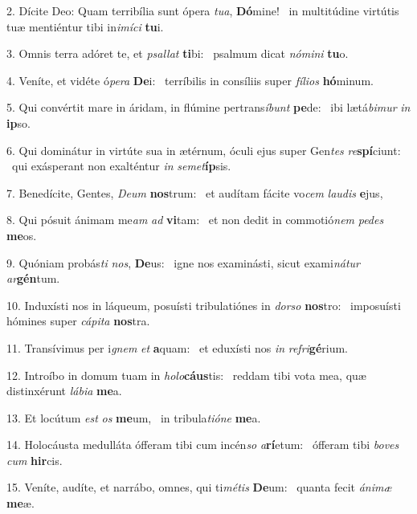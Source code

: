 2. Dícite Deo: Quam terribília sunt ópera \textit{tu}\textit{a}, \textbf{Dó}mine! \ast\  in multitúdine virtútis tuæ mentiéntur tibi in\textit{i}\textit{mí}\textit{ci} \textbf{tu}i.\

3. Omnis terra adóret te, et \textit{psal}\textit{lat} \textbf{ti}bi: \ast\  psalmum dicat \textit{nó}\textit{mi}\textit{ni} \textbf{tu}o.\

4. Veníte, et vidéte ó\textit{pe}\textit{ra} \textbf{De}i: \ast\  terríbilis in consíliis super \textit{fí}\textit{li}\textit{os} \textbf{hó}minum.\

5. Qui convértit mare in áridam, in flúmine pertrans\textit{í}\textit{bunt} \textbf{pe}de: \ast\  ibi lætá\textit{bi}\textit{mur} \textit{in} \textbf{ip}so.\

6. Qui dominátur in virtúte sua in ætérnum, óculi ejus super Gen\textit{tes} \textit{re}\textbf{spí}ciunt: \ast\  qui exásperant non exalténtur \textit{in} \textit{se}\textit{met}\textbf{íp}sis.\

7. Benedícite, Gentes, \textit{De}\textit{um} \textbf{nos}trum: \ast\  et audítam fácite vo\textit{cem} \textit{lau}\textit{dis} \textbf{e}jus,\

8. Qui pósuit ánimam me\textit{am} \textit{ad} \textbf{vi}tam: \ast\  et non dedit in commotió\textit{nem} \textit{pe}\textit{des} \textbf{me}os.\

9. Quóniam probás\textit{ti} \textit{nos}, \textbf{De}us: \ast\  igne nos examinásti, sicut exami\textit{ná}\textit{tur} \textit{ar}\textbf{gén}tum.\

10. Induxísti nos in láqueum, posuísti tribulatiónes in \textit{dor}\textit{so} \textbf{nos}tro: \ast\  imposuísti hómines super \textit{cá}\textit{pi}\textit{ta} \textbf{nos}tra.\

11. Transívimus per i\textit{gnem} \textit{et} \textbf{a}quam: \ast\  et eduxísti nos \textit{in} \textit{re}\textit{fri}\textbf{gé}rium.\

12. Introíbo in domum tuam in \textit{ho}\textit{lo}\textbf{cáus}tis: \ast\  reddam tibi vota mea, quæ distinxérunt \textit{lá}\textit{bi}\textit{a} \textbf{me}a.\

13. Et locútum \textit{est} \textit{os} \textbf{me}um, \ast\  in tribula\textit{ti}\textit{ó}\textit{ne} \textbf{me}a.\

14. Holocáusta medulláta ófferam tibi cum incén\textit{so} \textit{a}\textbf{rí}etum: \ast\  ófferam tibi \textit{bo}\textit{ves} \textit{cum} \textbf{hir}cis.\

15. Veníte, audíte, et narrábo, omnes, qui ti\textit{mé}\textit{tis} \textbf{De}um: \ast\  quanta fecit \textit{á}\textit{ni}\textit{mæ} \textbf{me}æ.\

